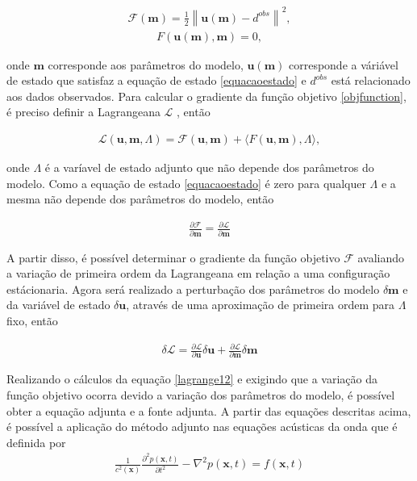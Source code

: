 \begin{eqnarray}
\label{objfunction}
 \mathcal{F}(\mathbf{m}) = \frac{1}{2} \left \| \mathbf{u}(\mathbf{m}) - d^{obs} \right \|^{2},
\end{eqnarray}
\begin{eqnarray}
 \label{equacaoestado}
 F(\mathbf{u}(\mathbf{m}), \mathbf{m} ) = 0,
\end{eqnarray}

onde $\mathbf{m}$ corresponde aos parâmetros do modelo, $\mathbf{u}(\mathbf{m})$ corresponde a váriável de estado que satisfaz a equação de estado \ref{equacaoestado} e $d^{obs}$ está relacionado aos dados observados. Para calcular o gradiente da função objetivo \ref{objfunction}, é preciso definir a Lagrangeana $\mathcal{L}$ , então

\begin{eqnarray}
\label{lagrange123}
 \mathcal{L} (\mathbf{u}, \mathbf{m}, \Lambda) = \mathcal{F}(\mathbf{u},\mathbf{m}) + \langle F(\mathbf{u}, \mathbf{m}), \Lambda\rangle ,
\end{eqnarray}

onde $\Lambda$ é a varíavel de estado adjunto que não depende dos parâmetros do modelo. Como a equação de estado \ref{equacaoestado} é zero para qualquer $\Lambda$ e a mesma não depende dos parâmetros do modelo, então

\begin{eqnarray}
  \frac{\partial \mathcal{F}}{\partial \mathbf{m}} = \frac{\partial \mathcal{L}}{\partial \mathbf{m}}
\end{eqnarray}


A partir disso, é possível determinar o gradiente da função objetivo $\mathcal{F}$ avaliando a variação de primeira ordem da Lagrangeana em relação a uma configuração estácionaria. Agora será realizado a perturbação dos parâmetros do modelo $\delta \mathbf{m}$ e da variável de estado $\delta \mathbf{u}$, através de uma aproximação de primeira ordem para $\Lambda$ fixo, então

\begin{eqnarray}
\label{lagrange12}
 \delta \mathcal{L} = \frac{\partial \mathcal{L}}{\partial \mathbf{u}} \delta \mathbf{u} + \frac{\partial \mathcal{L}}{\partial \mathbf{m}} \delta \mathbf{m}
\end{eqnarray}


Realizando o cálculos da equação \ref{lagrange12} e exigindo que a variação da função objetivo ocorra devido a variação dos parâmetros do modelo, é possível obter a equação adjunta e a fonte adjunta. A partir das equações descritas acima, é possível a aplicação do método adjunto nas equações acústicas da onda que é definida por
\begin{eqnarray}
 \frac{1}{c^{2}(\mathbf{x})} \frac{\partial ^{2} p(\mathbf{x},t)}{\partial t^{2}} - \nabla^{2} p(\mathbf{x},t) = f(\mathbf{x},t)
\end{eqnarray}

